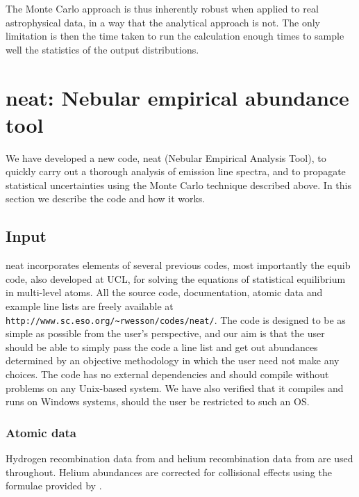 \documentclass[useAMS,usenatbib]{mn2e}
\begin{document}
The Monte Carlo approach is thus inherently robust when applied to real astrophysical data, in a way that the analytical approach is not.  The only limitation is then the time taken to run the calculation enough times to sample well the statistics of the output distributions.

\section{{\sc neat}: Nebular empirical abundance tool}

We have developed a new code, {\sc neat} (Nebular Empirical Analysis Tool), to quickly carry out a thorough analysis of emission line spectra, and to propagate statistical uncertainties using the Monte Carlo technique described above.  In this section we describe the code and how it works.

\subsection{Input}

{\sc neat} incorporates elements of several previous codes, most importantly the {\sc equib} code, also developed at UCL, for solving the equations of statistical equilibrium in multi-level atoms.  All the source code, documentation, atomic data and example line lists are freely available at \texttt{http://www.sc.eso.org/\~{}rwesson/codes/neat/}.  The code is designed to be as simple as possible from the user's perspective, and our aim is that the user should be able to simply pass the code a line list and get out abundances determined by an objective methodology in which the user need not make any choices.  The code has no external dependencies and should compile without problems on any Unix-based system.  We have also verified that it compiles and runs on Windows systems, should the user be restricted to such an OS.

\subsubsection{Atomic data}

Hydrogen recombination data from \citet{1995MNRAS.272...41S} and helium recombination data from \citet{1996MNRAS.278..683S} are used throughout.  Helium abundances are corrected for collisional effects using the formulae provided by \citet{1995ApJ...442..714K}.
\end{document}
